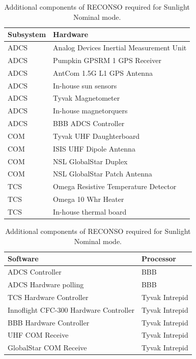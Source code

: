 \documentclass{article}
\begin{document}
\begin{table}[h!]
\caption{Additional components of RECONSO required for Sunlight Nominal mode.}
\begin{adjustbox}{center}
\begin{tabular}{|l|l|}
\hline
Subsystem & Hardware \\ \hline \hline
ADCS & Analog Devices Inertial Measurement Unit  \\ \hline
ADCS & Pumpkin GPSRM 1 GPS Receiver \\ \hline
ADCS & AntCom 1.5G L1 GPS Antenna  \\ \hline
ADCS & In-house sun sensors  \\ \hline
ADCS & Tyvak Magnetometer \\ \hline
ADCS & In-house magnetorquers \\ \hline
ADCS & BBB ADCS Controller \\ \hline \hline
COM & Tyvak UHF Daughterboard  \\ \hline
COM & ISIS UHF Dipole Antenna  \\ \hline
COM & NSL GlobalStar Duplex  \\ \hline
COM & NSL GlobalStar Patch Antenna \\ \hline \hline
TCS & Omega Resistive Temperature Detector \\ \hline
TCS & Omega 10 Whr Heater  \\ \hline
TCS & In-house thermal board \\ \hline
\end{tabular}

\quad

\begin{tabular}{|l|l|}
\hline
Software & Processor \\ \hline \hline
ADCS Controller & BBB \\ \hline
ADCS Hardware polling & BBB \\ \hline \hline
TCS Hardware Controller & Tyvak Intrepid \\ \hline
Innoflight CFC-300 Hardware Controller & Tyvak Intrepid \\ \hline
BBB Hardware Controller & Tyvak Intrepid \\ \hline
UHF COM Receive & Tyvak Intrepid \\ \hline
GlobalStar COM Receive & Tyvak Intrepid \\ \hline
\end{tabular}
\end{adjustbox}
\end{table}
\end{document}
